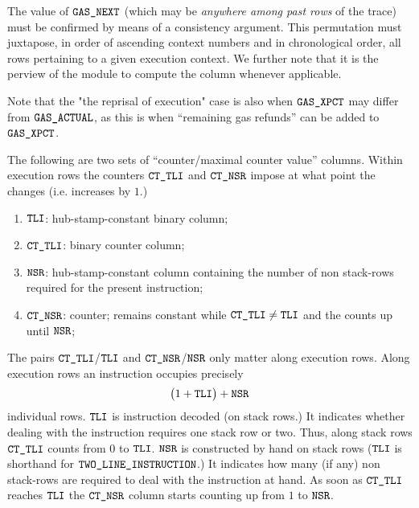 \saNote{}
The value of $\texttt{GAS}\texttt{\_NEXT}$ (which may be \emph{anywhere among past rows} of the trace) must be confirmed by means of a consistency argument.
This permutation must juxtapose, in order of ascending context numbers and in chronological order, all rows pertaining to a given execution context.
We further note that it is the perview of the \stpMod{} module to compute the \gasStipend{} column whenever applicable.

Note that the "the reprisal of execution" case is also when $\texttt{GAS}\texttt{\_XPCT}$ may differ from $\texttt{GAS}\texttt{\_ACTUAL}$, as this is when ``remaining gas refunds'' can be added to $\texttt{GAS}\texttt{\_XPCT}$.

The following are two sets of ``counter/maximal counter value'' columns. Within execution rows the counters $\texttt{CT}\texttt{\_}\texttt{TLI}$ and $\texttt{CT}\texttt{\_}\texttt{NSR}$ impose at what point the \hubStamp{} changes (i.e. increases by $1$.)
\begin{enumerate}[resume]
	\item $\texttt{TLI}{}$:
		hub-stamp-constant binary column;
	\item $\texttt{CT}\texttt{\_}\texttt{TLI}$:
		binary counter column;
	\item $\texttt{NSR}$:
		hub-stamp-constant column containing the number of non stack-rows required for the present instruction;
	\item $\texttt{CT}\texttt{\_}\texttt{NSR}$:
		counter; remains constant while $\texttt{CT}\texttt{\_}\texttt{TLI} \neq \texttt{TLI}$ and the counts up until $\texttt{NSR}$;
\end{enumerate}
The pairs
$\texttt{CT}\texttt{\_}\texttt{TLI}$/$\texttt{TLI}$ and
$\texttt{CT}\texttt{\_}\texttt{NSR}$/$\texttt{NSR}$
only matter along execution rows.
Along execution rows an instruction occupies precisely
\[
	\big( 1 + \texttt{TLI} \big) + \texttt{NSR}
\]
individual rows.
$\texttt{TLI}$ is instruction decoded (on stack rows.)
It indicates whether dealing with the instruction requires one stack row or two.
Thus, along stack rows $\texttt{CT}\texttt{\_}\texttt{TLI}$ counts from $0$ to $\texttt{TLI}$.
$\texttt{NSR}$ is constructed by hand on stack rows ($\texttt{TLI}$ is shorthand for $\texttt{TWO\_LINE\_INSTRUCTION}{}$.)
It indicates how many (if any) non stack-rows are required to deal with the instruction at hand.
As soon as $\texttt{CT}\texttt{\_}\texttt{TLI}$ reaches $\texttt{TLI}$ the $\texttt{CT}\texttt{\_}\texttt{NSR}$ column starts counting up from $1$ to $\texttt{NSR}$.
